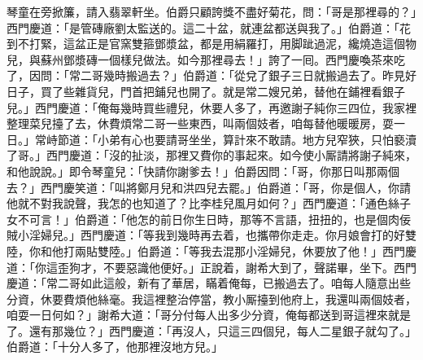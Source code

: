 琴童在旁掀簾，請入翡翠軒坐。伯爵只顧誇獎不盡好菊花，問：「哥是那裡尋的？」西門慶道：「是管磚廠劉太監送的。這二十盆，就連盆都送與我了。」伯爵道：「花到不打緊，這盆正是官窯雙箍鄧漿盆，{}都是用絹羅打，用脚跐過泥，纔燒造這個物兒，與蘇州鄧漿磚一個樣兒做法。如今那裡尋去！」誇了一囘。西門慶喚茶來吃了，因問：「常二哥幾時搬過去？」伯爵道：「從兌了銀子三日就搬過去了。昨見好日子，買了些雜貨兒，門首把鋪兒也開了。就是常二嫂兄弟，替他在鋪裡看銀子兒。」西門慶道：「俺每幾時買些禮兒，休要人多了，再邀謝子純你三四位，我家裡整理菜兒擡了去，休費煩常二哥一些東西，叫兩個妓者，咱每替他暖暖房，耍一日。」常峙節道：「小弟有心也要請哥坐坐，算計來不敢請。地方兒窄狹，只怕褻瀆了哥。」西門慶道：「沒的扯淡，那裡又費你的事起來。如今使小厮請將謝子純來，和他說說。」即令琴童兒：「快請你謝爹去！」伯爵因問：「哥，你那日叫那兩個去？」西門慶笑道：「叫將鄭月兒和洪四兒去罷。」伯爵道：「哥，你是個人，你請他就不對我說聲，我怎的也知道了？比李桂兒風月如何？」西門慶道：「通色絲子女不可言！」伯爵道：「他怎的前日你生日時，那等不言語，扭扭的，也是個肉佞賊小淫婦兒。」西門慶道：「等我到幾時再去着，也攜帶你走走。你月娘會打的好雙陸，你和他打兩貼雙陸。」伯爵道：「等我去混那小淫婦兒，休要放了他！」西門慶道：「你這歪狗才，不要惡識他便好。」正說着，謝希大到了，聲諾畢，坐下。西門慶道：「常二哥如此這般，新有了華居，瞞着俺每，已搬過去了。咱每人隨意出些分資，休要費煩他絲毫。我這裡整治停當，教小厮擡到他府上，我還叫兩個妓者，咱耍一日何如？」謝希大道：「哥分付每人出多少分資，俺每都送到哥這裡來就是了。還有那幾位？」西門慶道：「再沒人，只這三四個兒，每人二星銀子就勾了。」伯爵道：「十分人多了，他那裡沒地方兒。」

